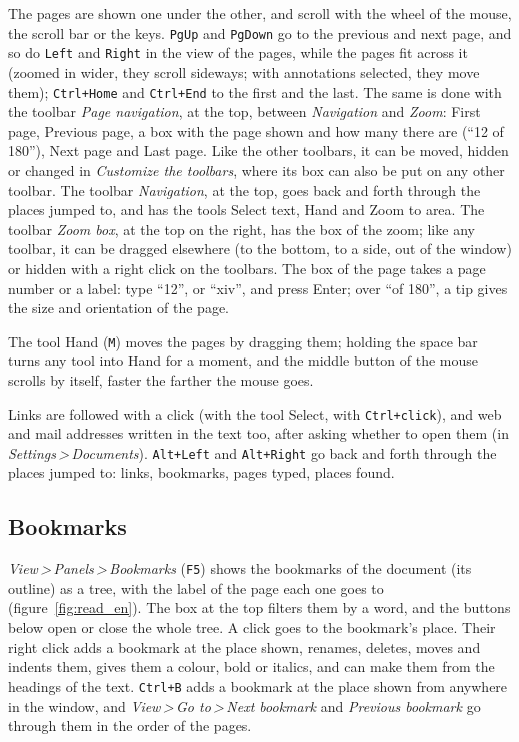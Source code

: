 \documentclass[12pt,
              article,
              oneside
              ]{memoir}
\newcommand*{\menu}[1]{\textit{#1}}
\newcommand*{\then}{\,>\,}
\newcommand*{\key}[1]{\texttt{#1}}
\begin{document}
%
The pages are shown one under the other, and scroll with the wheel of the
mouse, the scroll bar or the keys. \key{PgUp} and \key{PgDown} go to the
previous and next page, and so do \key{Left} and \key{Right} in the view
of the pages, while the pages fit across it (zoomed in wider, they scroll
sideways; with annotations selected, they move them); \key{Ctrl+Home} and \key{Ctrl+End} to the first and
the last. The same is done with the toolbar \menu{Page navigation}, at the
top, between \menu{Navigation} and \menu{Zoom}: First page, Previous page, a box with the page shown
and how many there are (\enquote{12 of 180}), Next page and Last page. Like
the other toolbars, it can be moved, hidden or changed in \menu{Customize
the toolbars}, where its box can also be put on any other toolbar. The
toolbar \menu{Navigation}, at the top, goes back and forth through the
places jumped to, and has the tools Select text, Hand and Zoom to area. The
toolbar \menu{Zoom box}, at the top on the right, has the box of the zoom;
like any toolbar, it can be dragged elsewhere (to the bottom, to a side,
out of the window) or hidden with a right click on the toolbars. The box of
the page takes a page number or a label: type \enquote{12}, or
\enquote{xiv}, and press Enter; over \enquote{of 180}, a tip gives the
size and orientation of the page.

%
The tool Hand (\key{M}) moves the pages by dragging them; holding the space
bar turns any tool into Hand for a moment, and the middle button of the
mouse scrolls by itself, faster the farther the mouse goes.

%
Links are followed with a click (with the tool Select, with
\key{Ctrl+click}), and web and mail addresses written in the text too,
after asking whether to open them (in \menu{Settings\then Documents}).
\key{Alt+Left} and \key{Alt+Right} go back and forth through the places
jumped to: links, bookmarks, pages typed, places found.

\subsection{Bookmarks}

%
\menu{View\then Panels\then Bookmarks} (\key{F5}) shows the bookmarks of
the document (its outline) as a tree, with the label of the page each one
goes to (figure~\ref{fig:read_en}). The box at the top filters them by a
word, and the buttons below open or close the whole tree. A click goes to
the bookmark's place. Their right click adds a bookmark at the place shown,
renames, deletes, moves and indents them, gives them a colour, bold or
italics, and can make them from the headings of the text.
\key{Ctrl+B} adds a bookmark at the place shown from anywhere in the window,
and \menu{View\then Go to\then Next bookmark} and \menu{Previous bookmark}
go through them in the order of the pages.
\end{document}
